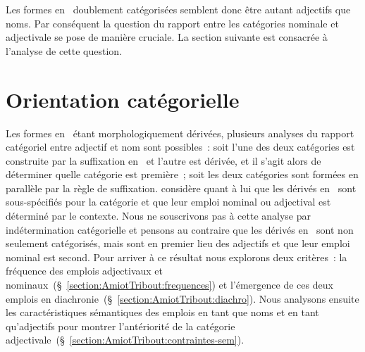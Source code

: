 \documentclass[output=paper]{LSP/langsci}
\begin{document}
\begin{exe}
\ex \label{ex:AmiotTribout:fonctions-N}
\begin{xlist}
\end{xlist}
\end{exe}

Les formes en \iste\ doublement catégorisées semblent donc être autant adjectifs que noms. Par conséquent la question du rapport entre les catégories nominale et adjectivale se pose de manière cruciale. La section suivante est consacrée à l'analyse de cette question.




\section{Orientation catégorielle} \label{section:AmiotTribout:orientation}
Les formes en \iste\ étant morphologiquement dérivées, plusieurs analyses du rapport catégoriel entre adjectif et nom sont possibles~: soit l'une des deux catégories est construite par la suffixation en \iste\ et l'autre est dérivée, et il s'agit alors de déterminer quelle catégorie est première~; soit les deux catégories sont formées en parallèle par la règle de suffixation. \citet[92]{roche11} considère quant à lui que les dérivés en \iste\ sont sous-spécifiés pour la catégorie et que leur emploi nominal ou adjectival est déterminé par le contexte.
Nous ne souscrivons pas à cette analyse par indétermination catégorielle et pensons au contraire que les dérivés en \iste\ sont non seulement catégorisés, mais sont en premier lieu des adjectifs et que leur emploi nominal est second. Pour arriver à ce résultat nous explorons deux critères~: la fréquence des emplois adjectivaux et nominaux~(§~\ref{section:AmiotTribout:frequences}) et l'émergence de ces deux emplois en diachronie~(§~\ref{section:AmiotTribout:diachro}). Nous analysons ensuite les caractéristiques sémantiques des emplois en tant que noms et en tant qu'adjectifs pour montrer l'antériorité de la catégorie adjectivale~(§~\ref{section:AmiotTribout:contraintes-sem}).
\end{document}
